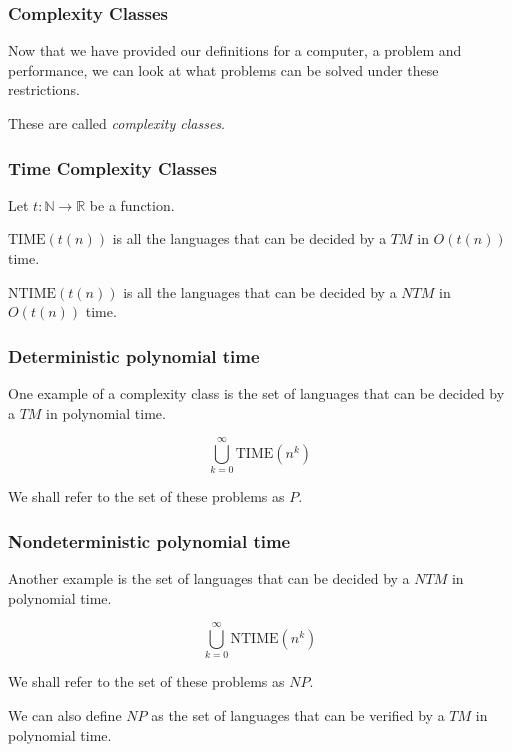 \documentclass[aspectratio=169]{beamer}
\begin{document}
\begin{frame}
\frametitle{Complexity Classes}
Now that we have provided our definitions for a computer, a problem and performance, we can look at what problems can be solved under these restrictions.

These are called {\em complexity classes}.
\end{frame}

\begin{frame}
\frametitle{Time Complexity Classes}
Let $t: \mathbb{N} \to \mathbb{R}$ be a function.

$\mathrm{TIME}(t(n))$ is all the languages that can be decided by a $TM$ in $O(t(n))$ time.

$\mathrm{NTIME}(t(n))$ is all the languages that can be decided by a $NTM$ in $O(t(n))$ time.
\end{frame}

\begin{frame}
\frametitle{Deterministic polynomial time}
One example of a complexity class is the set of languages that can be decided by a $TM$ in polynomial time.

$$\bigcup_{k = 0}^{\infty} \mathrm{TIME}(n^k)$$

We shall refer to the set of these problems as $P$.
\end{frame}

\begin{frame}
\frametitle{Nondeterministic polynomial time}
Another example is the set of languages that can be decided by a $NTM$ in polynomial time.

$$\bigcup_{k = 0}^{\infty} \mathrm{NTIME}(n^k)$$

We shall refer to the set of these problems as $NP$.

We can also define $NP$ as the set of languages that can be verified by a $TM$ in polynomial time.
\end{frame}
\end{document}
